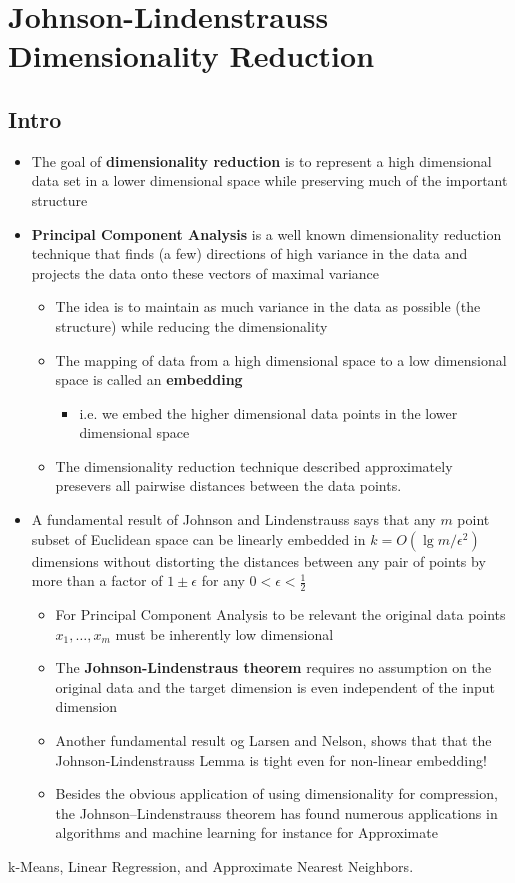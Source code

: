 \documentclass[11pt]{article}
\begin{document}
\section{Johnson-Lindenstrauss Dimensionality Reduction}
\label{sec:orgf24fdff}
\subsection{Intro}
\label{sec:org244d90e}
\begin{itemize}
\item The goal of \textbf{dimensionality reduction} is to represent a high dimensional data set in a lower dimensional space while preserving much of the important structure

\item \textbf{Principal Component Analysis} is a well known dimensionality reduction technique that finds (a few) directions of high variance in the data and projects the data onto these vectors of maximal variance
\begin{itemize}
\item The idea is to maintain as much variance in the data as possible (the structure) while reducing the dimensionality
\item The mapping of data from a high dimensional space to a low dimensional space is called an \textbf{embedding}
\begin{itemize}
\item i.e. we embed the higher dimensional data points in the lower dimensional space
\end{itemize}
\item The dimensionality reduction technique described approximately presevers all pairwise distances between the data points.
\end{itemize}

\item A fundamental result of Johnson and Lindenstrauss says that any \(m\) point subset of Euclidean space can be linearly embedded in \(k=O(\lg m/\epsilon^2)\) dimensions without distorting the distances between any pair of points by more than a factor of \(1 \pm \epsilon\) for any \(0 < \epsilon < \frac12\)
\begin{itemize}
\item For Principal Component Analysis to be relevant the original data points \(x_1, \dots, x_m\) must be inherently low dimensional
\item The \textbf{Johnson-Lindenstraus theorem} requires no assumption on the original data and the target dimension is even independent of the input dimension
\item Another fundamental result og Larsen and Nelson, shows that that the Johnson-Lindenstrauss Lemma is tight even for non-linear embedding!
\item Besides the obvious application of using dimensionality for compression, the Johnson–Lindenstrauss theorem has found numerous applications in algorithms and machine learning for instance for Approximate
\end{itemize}
\end{itemize}
k-Means, Linear Regression, and Approximate Nearest Neighbors.
\end{document}
